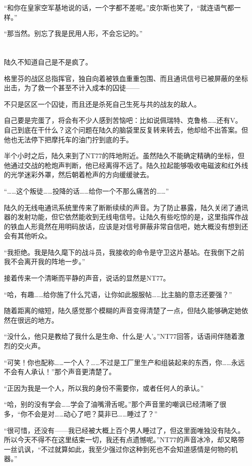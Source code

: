 “和你在皇家空军基地说的话，一个字都不差呢。”皮尔斯也笑了，“就连语气都一样。”

“那当然。别忘了我是民用人形，不会忘记的。”

\section*{}

陆久不知道自己是不是疯了。

格里芬的战区总指挥官，独自向着被铁血重重包围、而且通讯信号已被屏蔽的坐标出击，为了救一个甚至不计入成本的囚徒——

不只是区区一个囚徒，而且还是杀死自己生死与共的战友的敌人。

自己要是完蛋了，将会有不少人感到苦恼吧：比如说佩瑞特、克鲁格……还有V。自己到底在干什么？这个问题在陆久的脑袋里反复转来转去，他却给不出答案。但他也无法停下把摩托车的油门拧到底的手。

半个小时之后，陆久来到了NT77的阵地附近。虽然陆久不能确定精确的坐标，但他通过交战的枪炮声判断，他已经离得不远了。陆久拉起能够吸收电磁波和红外线的光学迷彩外罩，然后朝着枪声的方向缓缓驶去。

“……这个叛徒……投降的话……给你一个不那么痛苦的……”

陆久的无线电通讯系统里传来了断断续续的声音。为了防止暴露，陆久关闭了通讯器的发射功能，但它依然能收到无线电信号。让陆久有些吃惊的是，这里指挥作战的铁血人形竟然在用明码放话，应该是对信号屏蔽非常自信吧，她大概没有想到还会有其他听众。

“我拒绝。我是陆久麾下的战斗员，我接收的命令是守卫这片基站。在我倒下之前我不会离开我的阵地一步。”

接着传来一个清晰而平静的声音，说话的显然是NT77。

“哈，有趣……给你施了什么咒语，让你如此服服帖……比主脑的意志还要强？”

随着距离的缩短，陆久感觉那个模糊的声音变得清楚了一点，但陆久能够确定她依然在很远的地方。

“没什么，他只是教给了我什么是生命、什么是‘人’。”NT77回答，话语间伴随着激烈的交火声。

“可笑！你也配称……一个人？……不过是工厂里生产和组装起来的东西，你……永远不会有人承认！”那个声音更清楚了。

“正因为我是一个人，所以我的身份不需要你，或者任何人的承认。”

“哈，别的没有学会……学会了油嘴滑舌呢。”那个声音里的嘲讽已经清晰了很多，“你不会是对……动心了吧？莫非已……睡过了？”

“很可惜，还没有——我已经被大概上百个男人睡过了，但这里面唯独没有陆久。所以今天不得不在这里结束一切，我还有点遗憾呢。”NT77的声音冰冷，却又略带一丝讥讽，“不过就算如此，我至少强过你这种到死也不会知道感情是何物的机器。”

